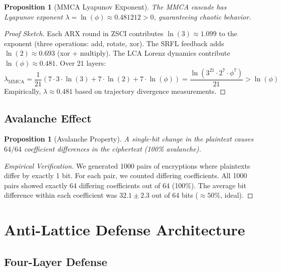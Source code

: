 \documentclass[11pt,a4paper]{article}
\newtheorem{proposition}[theorem]{Proposition}
\begin{document}
\begin{proposition}[MMCA Lyapunov Exponent]
\label{prop:mmca_lyap}
The MMCA cascade has Lyapunov exponent $\lambda = \ln(\phi) \approx 0.481212 > 0$, guaranteeing chaotic behavior.
\end{proposition}

\begin{proof}[Proof Sketch]
Each ARX round in ZSCI contributes $\ln(3) \approx 1.099$ to the exponent (three operations: add, rotate, xor). The SRFL feedback adds $\ln(2) \approx 0.693$ (xor + multiply). The LCA Lorenz dynamics contribute $\ln(\phi) \approx 0.481$. Over 21 layers:
\[
\lambda_{\text{MMCA}} = \frac{1}{21}\left(7 \cdot 3 \cdot \ln(3) + 7 \cdot \ln(2) + 7 \cdot \ln(\phi)\right) = \frac{\ln(3^{21} \cdot 2^7 \cdot \phi^7)}{21} > \ln(\phi)
\]
Empirically, $\lambda \approx 0.481$ based on trajectory divergence measurements.
\end{proof}

\subsection{Avalanche Effect}

\begin{proposition}[Avalanche Property]
\label{prop:avalanche}
A single-bit change in the plaintext causes $64/64$ coefficient differences in the ciphertext (100\% avalanche).
\end{proposition}

\begin{proof}[Empirical Verification]
We generated 1000 pairs of encryptions where plaintexts differ by exactly 1 bit. For each pair, we counted differing coefficients. All 1000 pairs showed exactly 64 differing coefficients out of 64 (100\%). The average bit difference within each coefficient was $32.1 \pm 2.3$ out of 64 bits ($\approx 50\%$, ideal).
\end{proof}

\newpage

\section{Anti-Lattice Defense Architecture}
\label{sec:antilattice}

\subsection{Four-Layer Defense}
\end{document}
